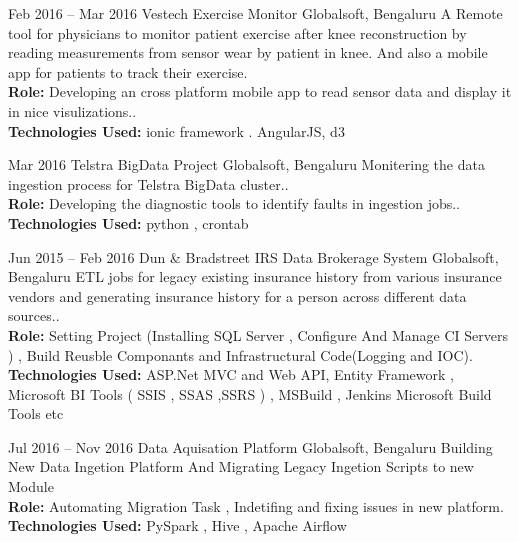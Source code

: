 \documentclass[]{friggeri-cv} %
\begin{document}
\begin{entrylist}
\entry
{Feb 2016 -- Mar 2016}
{Vestech Exercise Monitor}
{Globalsoft, Bengaluru}
{A Remote tool for physicians to monitor patient exercise after knee reconstruction by reading measurements from sensor wear by patient in knee. And also a mobile app for patients to track their exercise.\\
\textbf{Role:} Developing an cross platform mobile app to read sensor data and display it in nice visulizations..\\
\textbf{Technologies Used:} ionic framework . AngularJS, d3}
\end{entrylist}

\begin{entrylist}
\entry
{Mar 2016}
{Telstra BigData Project}
{Globalsoft, Bengaluru}
{Monitering the data ingestion process for Telstra BigData cluster..\\
\textbf{Role:} Developing the diagnostic tools to identify faults in ingestion jobs..\\
\textbf{Technologies Used:} python , crontab}
\end{entrylist}

\begin{entrylist}
\entry
{Jun 2015 -- Feb 2016}
{Dun \& Bradstreet IRS Data Brokerage System}
{Globalsoft, Bengaluru}
{ETL jobs for legacy existing insurance history from various insurance vendors and generating insurance history for a person across different data sources..\\
\textbf{Role:} Setting Project (Installing SQL Server , Configure And Manage CI Servers ) ,  
Build Reusble Componants and Infrastructural Code(Logging and IOC).\\
\textbf{Technologies Used:} ASP.Net MVC and Web API, Entity Framework , Microsoft BI Tools ( SSIS , SSAS ,SSRS ) , 
MSBuild , Jenkins Microsoft Build Tools etc}
\end{entrylist}


\begin{entrylist}
\entry
{Jul 2016 -- Nov 2016}
{Data Aquisation Platform}
{Globalsoft, Bengaluru}
{Building New Data Ingetion Platform And Migrating Legacy Ingetion Scripts to new Module\\
\textbf{Role:} Automating Migration Task , Indetifing and fixing issues in new platform.\\
\textbf{Technologies Used:} PySpark , Hive , Apache Airflow}
\end{entrylist}
\end{document}
